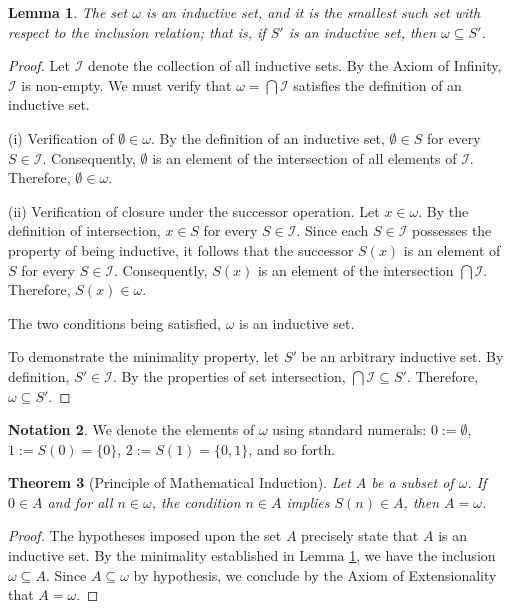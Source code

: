 \documentclass[11pt, a4paper]{article}
\theoremstyle{plain}
\newtheorem{theorem}{Theorem}[section]
\newtheorem{lemma}[theorem]{Lemma}
\theoremstyle{definition}
\newtheorem{notation}[theorem]{Notation}
\numberwithin{equation}{section}
\begin{document}
\begin{lemma}\label{lem:omega_smallest_inductive}
The set $\omega$ is an inductive set, and it is the smallest such set with respect to the inclusion relation; that is, if $S'$ is an inductive set, then $\omega \subseteq S'$.
\end{lemma}
\begin{proof}
Let $\mathcal{I}$ denote the collection of all inductive sets. By the Axiom of Infinity, $\mathcal{I}$ is non-empty. We must verify that $\omega = \bigcap \mathcal{I}$ satisfies the definition of an inductive set.

(i) Verification of $\emptyset \in \omega$. By the definition of an inductive set, $\emptyset \in S$ for every $S \in \mathcal{I}$. Consequently, $\emptyset$ is an element of the intersection of all elements of $\mathcal{I}$. Therefore, $\emptyset \in \omega$.

(ii) Verification of closure under the successor operation. Let $x \in \omega$. By the definition of intersection, $x \in S$ for every $S \in \mathcal{I}$. Since each $S \in \mathcal{I}$ possesses the property of being inductive, it follows that the successor $S(x)$ is an element of $S$ for every $S \in \mathcal{I}$. Consequently, $S(x)$ is an element of the intersection $\bigcap \mathcal{I}$. Therefore, $S(x) \in \omega$.

The two conditions being satisfied, $\omega$ is an inductive set.

To demonstrate the minimality property, let $S'$ be an arbitrary inductive set. By definition, $S' \in \mathcal{I}$. By the properties of set intersection, $\bigcap \mathcal{I} \subseteq S'$. Therefore, $\omega \subseteq S'$.
\end{proof}

\begin{notation}
We denote the elements of $\omega$ using standard numerals: $0 := \emptyset$, $1 := S(0) = \{0\}$, $2 := S(1) = \{0, 1\}$, and so forth.
\end{notation}

\begin{theorem}[Principle of Mathematical Induction]\label{thm:induction}
Let $A$ be a subset of $\omega$. If $0 \in A$ and for all $n \in \omega$, the condition $n \in A$ implies $S(n) \in A$, then $A=\omega$.
\end{theorem}
\begin{proof}
The hypotheses imposed upon the set $A$ precisely state that $A$ is an inductive set. By the minimality established in Lemma \ref{lem:omega_smallest_inductive}, we have the inclusion $\omega \subseteq A$. Since $A \subseteq \omega$ by hypothesis, we conclude by the Axiom of Extensionality that $A=\omega$.
\end{proof}
\end{document}
